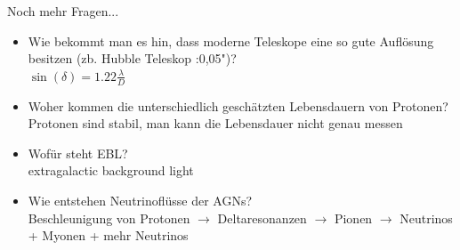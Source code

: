   \begin{frame}{Noch mehr Fragen...}

    \begin{itemize}
      \setlength\itemsep{2em}
      \item Wie bekommt man es hin, dass moderne Teleskope eine so gute Auflösung
            besitzen (zb. Hubble Teleskop :0,05")?\\[1em]
            $\sin(\delta) = 1.22\frac{\lambda}{D}$
      \item Woher kommen die unterschiedlich geschätzten Lebensdauern von Protonen?\\[1em]
            Protonen sind stabil, man kann die Lebensdauer nicht genau messen
      \item Wofür steht EBL?\\[1em]
            extragalactic background light
      \item Wie entstehen Neutrinoflüsse der AGNs?\\[1em]
            Beschleunigung von Protonen $\rightarrow$ Deltaresonanzen $\rightarrow$ Pionen $\rightarrow$ Neutrinos + Myonen + mehr Neutrinos
     \end{itemize}
  \end{frame}
